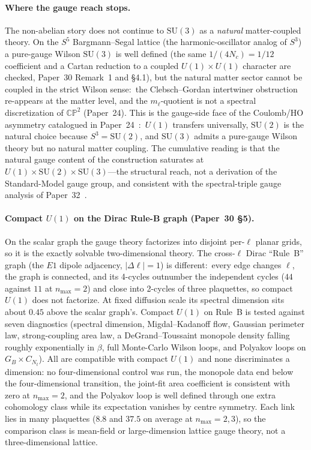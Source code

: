 \documentclass[aps,pra,twocolumn,superscriptaddress,longbibliography]{revtex4-2}
\begin{document}
\paragraph{Where the gauge reach stops.}
The non-abelian story does not continue to $\mathrm{SU}(3)$ as a
\emph{natural} matter-coupled theory.  On the $S^5$ Bargmann--Segal
lattice (the harmonic-oscillator analog of $S^3$) a pure-gauge Wilson
$\mathrm{SU}(3)$ is well defined (the same $1/(4N_c)=1/12$ coefficient and
a Cartan reduction to a coupled $U(1)\times U(1)$ character are checked,
Paper~30 Remark~1 and \S4.1), but the natural matter sector cannot be coupled
in the strict Wilson sense:\ the Clebsch--Gordan intertwiner obstruction
re-appears at the matter level, and the $m_\ell$-quotient is not a spectral
discretization of $\mathbb{CP}^2$ (Paper~24).  This is the gauge-side face of the Coulomb/HO asymmetry
catalogued in Paper~24~\cite{loutey_paper24}:\ $U(1)$ transfers
universally, $\mathrm{SU}(2)$ is the natural choice because
$S^3=\mathrm{SU}(2)$, and $\mathrm{SU}(3)$ admits a pure-gauge Wilson theory
but no natural matter coupling.  The cumulative
reading is that the natural gauge content of the construction saturates
at $U(1)\times\mathrm{SU}(2)\times\mathrm{SU}(3)$---the structural reach,
not a derivation of the Standard-Model gauge group, and consistent with
the spectral-triple gauge analysis of Paper~32~\cite{loutey_paper32}.

\paragraph{Compact $U(1)$ on the Dirac Rule-B graph (Paper~30 \S5).}
On the scalar graph the gauge theory factorizes into disjoint per-$\ell$
planar grids, so it is the exactly solvable two-dimensional theory.  The
cross-$\ell$ Dirac ``Rule~B'' graph (the $E1$ dipole adjacency,
$|\Delta\ell|=1$) is different:\ every edge changes $\ell$, the graph is
connected, and its 4-cycles outnumber the independent cycles ($44$ against
$11$ at $n_{\max}=2$) and close into 2-cycles of three plaquettes, so compact
$U(1)$ does not factorize.  At fixed diffusion scale its spectral dimension
sits about $0.45$ above the scalar graph's.  Compact $U(1)$ on Rule~B is
tested against seven diagnostics (spectral dimension, Migdal--Kadanoff
flow, Gaussian perimeter law, strong-coupling area law, a
DeGrand--Toussaint monopole density falling roughly exponentially in
$\beta$, full Monte-Carlo Wilson loops, and Polyakov loops on
$G_B\times C_{N_t}$).  All are compatible with compact $U(1)$ and none
discriminates a dimension: no four-dimensional control was run, the
monopole data end below the four-dimensional transition, the joint-fit
area coefficient is consistent with zero at $n_{\max}=2$, and the Polyakov
loop is well defined through one extra cohomology class while its
expectation vanishes by centre symmetry.  Each link lies in many plaquettes
($8.8$ and $37.5$ on average at $n_{\max}=2,3$), so the comparison class is
mean-field or large-dimension lattice gauge theory, not a
three-dimensional lattice.
\end{document}
